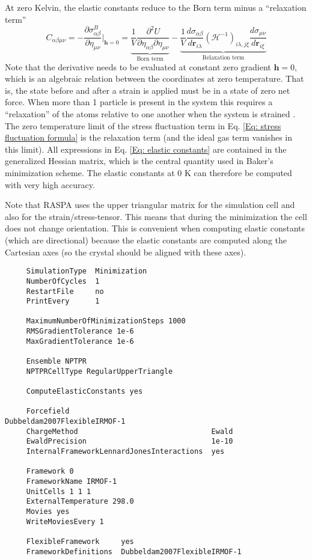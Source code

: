 At zero Kelvin, the elastic constants reduce to the Born term minus a ``relaxation term'' \cite{Lutsko1989}
\begin{equation}
C_{\alpha\beta\mu\nu}=
        -\frac{\partial\sigma_{\alpha\beta}^B}{\partial\eta_{\mu\nu}}\Bigg|_{\mathbf{h}=0}=
          \underbrace{\frac{1}{V}\frac{\partial^2 U}{\partial\eta_{\alpha\beta}\partial\eta_{\mu\nu}}}_{\text{Born term}}
        -\underbrace{\frac{1}{V}\frac{d\sigma_{\alpha\beta}}{d\mathbf{r}_{i\lambda}}\left({\mathcal H}^{-1}\right)_{i\lambda,j\xi}
         \frac{d\sigma_{\mu\nu}}{d\mathbf{r}_{i\xi}}}_{\text{Relaxation term}}
  \label{Eq: elastic constants}
\end{equation}
Note that the derivative needs to be evaluated at constant zero gradient $\mathbf{h}=0$, which is an algebraic relation between the coordinates
at zero temperature. That is, the state before and after a strain is applied must be in a state of zero net force.
When more than 1 particle is present in the system this requires a ``relaxation'' of the atoms relative to one
another when the system is strained \cite{Lutsko1989}.
The zero temperature limit of the stress fluctuation term in Eq. \ref{Eq: stress fluctuation formula}
is the relaxation term (and the ideal gas term vanishes in this limit).
All expressions in Eq. \ref{Eq: elastic constants} are contained in the generalized Hessian matrix, which
is the central quantity used in Baker's minimization scheme.
The elastic constants at 0 K can therefore be computed with very high accuracy.

Note that RASPA uses the upper triangular matrix for the simulation cell and
also for the strain/stress-tensor.
This means that during the minimization the cell does not change orientation. This is convenient when computing elastic constants (which are directional)
because the elastic constants are computed along the Cartesian axes (so the crystal should be aligned with these axes).

\begin{tiny}
\begin{verbatim}
     SimulationType  Minimization
     NumberOfCycles  1
     RestartFile     no
     PrintEvery      1

     MaximumNumberOfMinimizationSteps 1000
     RMSGradientTolerance 1e-6
     MaxGradientTolerance 1e-6

     Ensemble NPTPR
     NPTPRCellType RegularUpperTriangle

     ComputeElasticConstants yes

     Forcefield                                 Dubbeldam2007FlexibleIRMOF-1
     ChargeMethod                               Ewald
     EwaldPrecision                             1e-10
     InternalFrameworkLennardJonesInteractions  yes

     Framework 0
     FrameworkName IRMOF-1
     UnitCells 1 1 1
     ExternalTemperature 298.0
     Movies yes
     WriteMoviesEvery 1

     FlexibleFramework     yes
     FrameworkDefinitions  Dubbeldam2007FlexibleIRMOF-1
\end{verbatim}
\end{tiny}

